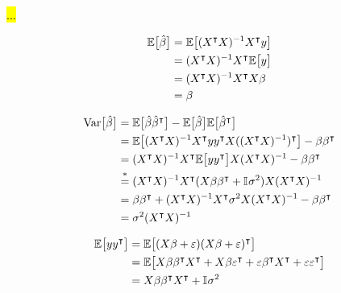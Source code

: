 \hl{...}

\begin{align*}
    \EE{\hat{\beta}} &= \EE{\invhessian X\TT y} \\
    &= \invhessian X\TT \EE{y} \\
    &= \invhessian \hessian \beta \\
    &= \beta
\end{align*}

\begin{align*}
    \variance{\hat{\beta}} &= \EE{\hat{\beta} \hat{\beta}\TT} -\EE{\hat{\beta}} \EE{\hat{\beta}\TT} \\
    &= \EE{\invhessian X\TT y y\TT X (\invhessian)\TT} - \beta \beta\TT \\
    &= \invhessian X\TT \EE{y y\TT } X \invhessian - \beta \beta\TT \\
    &\stackrel{\text{*}}{=}\invhessian X\TT ( X\beta \beta\TT + \II\sigma^2) X \invhessian \\
    &= \beta \beta \TT + \invhessian X\TT \sigma^2 X \invhessian - \beta \beta \TT \\
    &= \sigma^2 \invhessian
\end{align*}


\begin{align*}
    \EE{y y\TT} &= \EE{(X\beta + \epsilon)(X\beta + \epsilon)\TT} \\
    &= \EE{X\beta \beta\TT X\TT + X\beta \epsilon\TT + \epsilon\beta\TT X\TT + \epsilon \epsilon\TT} \\
    &= X\beta \beta\TT X\TT + \II \sigma^2
\end{align*}


